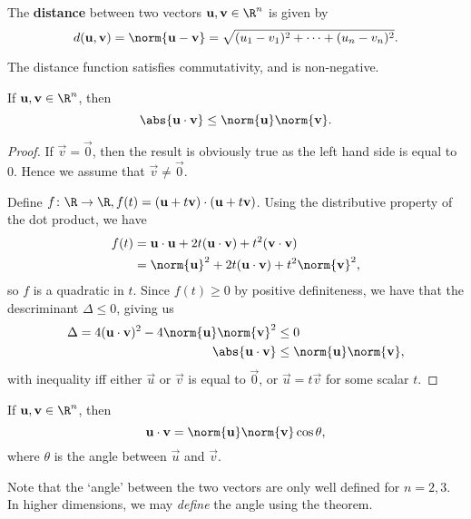 \begin{definition}[Distance]
  The \textbf{distance} between two vectors $\vec{u}, \vec{v} \in \R^n$ is given by \[
    d(\vec{u}, \vec{v}) = \norm{\vec{u} - \vec{v}} = \sqrt{(u_1 - v_1)^2 + \dots + (u_n - v_n)^2} 
  .\] 
\end{definition}
\begin{remark}
  The distance function satisfies commutativity, and is non-negative.
\end{remark}
\begin{theorem}
  If $\vec{u}, \vec{v} \in \R^n$, then \[
    \abs{\vec{u}\cdot \vec{v}}\le \norm{\vec{u}}\norm{\vec{v}}
  .\] 
\end{theorem}
\begin{proof}
  If $\vec{v} = \vec{0}$, then the result is obviously true as the left hand side is equal to 0. Hence we assume that $\vec{v} \neq  \vec{0}$.

  Define $f\colon \R \to \R, f(t) = (\vec{u} + t\vec{v})\cdot (\vec{u} + t\vec{v})$. Using the distributive property of the dot product, we have 
  \begin{align*}
    f(t) &= \vec{u}\cdot \vec{u} + 2t (\vec{u}\cdot \vec{v}) + t^2 (\vec{v}\cdot \vec{v}) \\
         &= \norm{\vec{u}}^2 + 2t(\vec{u}\cdot \vec{v}) + t^2 \norm{\vec{v}}^2,
  \end{align*} so $f$ is a quadratic in $t$. Since $f(t) \ge 0$ by positive definiteness, we have that the descriminant $\Delta \le  0$, giving us 
  \begin{align*}
    \Delta = 4(\vec{u}\cdot \vec{v})^2 - 4\norm{\vec{u}}\norm{\vec{v}}^2 &\le  0 \\
    \abs{\vec{u}\cdot \vec{v}} &\le \norm{\vec{u}}\norm{\vec{v}},
  \end{align*} with inequality iff either $\vec{u}$ or $\vec{v}$ is equal to $\vec{0}$, or $\vec{u} = t\vec{v}$ for some scalar $t$.
\end{proof}
\begin{theorem}
  If $\vec{u}, \vec{v} \in \R^n$, then \[
    \vec{u}\cdot \vec{v} = \norm{\vec{u}}\norm{\vec{v}}\cos \theta
  ,\] where $\theta$ is the angle between $\vec{u}$ and $\vec{v}$.
\end{theorem}
\begin{remark}
  Note that the `angle' between the two vectors are only well defined for $n = 2, 3$. In higher dimensions, we may \emph{define} the angle using the theorem.
\end{remark}
